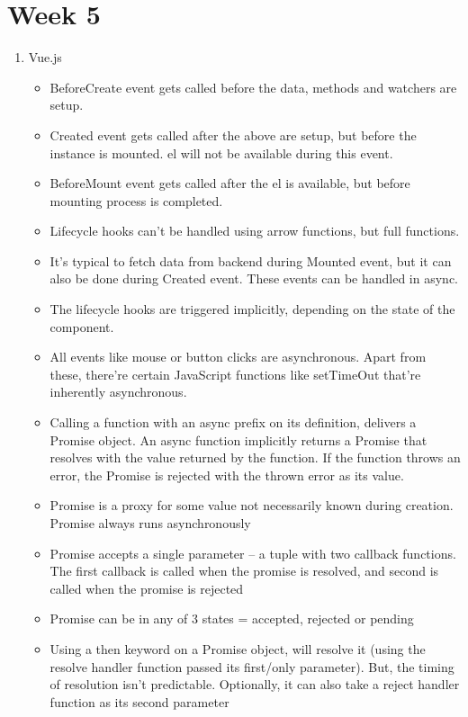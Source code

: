 \documentclass[a4paper]{article}
\begin{document}
\section{Week 5}
\begin{enumerate}
    \item Vue.js
    \begin{itemize}
        \item BeforeCreate event gets called before the data, methods and watchers are setup. 
        \item Created  event gets called after the above are setup, but before the instance is mounted. el will not be available during this event.
        \item BeforeMount  event gets called after the el is available, but before mounting process is completed.
        \item Lifecycle hooks can’t be handled using arrow functions, but full functions.
        \item It’s typical to fetch  data from backend during Mounted event, but it can also be done during Created event. These events can be handled in async.
        \item The lifecycle hooks are triggered implicitly, depending on the state of the component.
        \item All events like mouse or button clicks are asynchronous.  Apart from these, there’re certain JavaScript functions like setTimeOut that’re inherently asynchronous.
        \item Calling a function with an async prefix on its definition, delivers a Promise  object. An async function implicitly returns a Promise that resolves with the value returned by the function. If the function throws an error, the Promise is rejected with the thrown error as its value.
        \item Promise is a proxy for some value not necessarily known during creation. Promise always runs asynchronously
        \item Promise accepts a single parameter – a tuple with two callback functions. The first callback is called when the promise is resolved, and second is called when the promise is rejected
        \item Promise  can be in any of 3 states = accepted, rejected or pending
        \item Using a then keyword on a Promise object, will resolve it  (using the resolve handler  function passed its first/only parameter). But, the timing of resolution isn’t predictable.  Optionally, it can also take a reject handler function as its second parameter

\end{itemize}
\end{enumerate}
\end{document}
